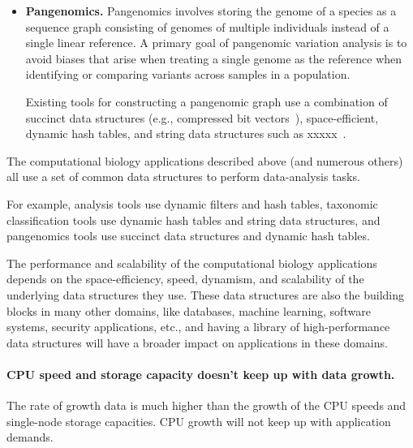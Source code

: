 \begin{itemize}[leftmargin=*]



\item {\bf Pangenomics.}
Pangenomics involves storing the genome of a species as a sequence graph consisting of genomes of multiple individuals instead of a single linear reference. A primary goal of pangenomic variation analysis is to avoid biases that arise when treating a single genome as the reference when identifying or comparing variants across samples in a population.

Existing tools for  constructing a pangenomic graph use a combination of succinct data structures (e.g., compressed bit vectors~\cite{xxx}), space-efficient, dynamic hash tables, and string data structures such as xxxxx~\cite{xxx}.

\end{itemize}


The computational biology applications described above (and numerous others) all use a set of common data structures to perform data-analysis tasks.



For example, \kmer analysis tools use dynamic filters and hash tables, taxonomic classification tools use dynamic hash tables and string data structures, and pangenomics tools use succinct data structures and dynamic hash tables.


The performance and scalability of the computational biology applications
depends on the space-efficiency, speed, dynamism, and scalability of the
underlying data structures they use. These data structures are also the building
blocks in many other domains, like databases, machine learning, software
systems, security applications, etc., and having a library of high-performance
data structures will have a broader impact on applications in these domains.


\paragraph{CPU speed and storage capacity doesn't keep up with data growth.}
The rate of growth data is much higher than the growth of the CPU speeds and single-node storage capacities.
CPU growth will not keep up with application demands.

